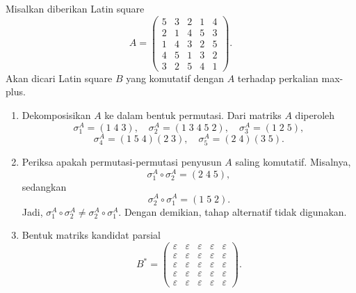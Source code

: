 \begin{contoh}\label{contoh:penerapan_algoritma_ordo_5_umum}
  Misalkan diberikan Latin square
  \[
    A=
    \begin{pmatrix}
      5 & 3 & 2 & 1 & 4 \\
      2 & 1 & 4 & 5 & 3 \\
      1 & 4 & 3 & 2 & 5 \\
      4 & 5 & 1 & 3 & 2 \\
      3 & 2 & 5 & 4 & 1
    \end{pmatrix}.
  \]
  Akan dicari Latin square $B$ yang komutatif dengan $A$ terhadap perkalian
  max-plus.

  \begin{enumerate}
    \item Dekomposisikan $A$ ke dalam bentuk permutasi. Dari matriks $A$
          diperoleh
          \[
            \sigma_1^A=(1\;4\;3),\quad
            \sigma_2^A=(1\;3\;4\;5\;2),\quad
            \sigma_3^A=(1\;2\;5),
          \]
          \[
            \sigma_4^A=(1\;5\;4)(2\;3),\quad
            \sigma_5^A=(2\;4)(3\;5).
          \]

    \item Periksa apakah permutasi-permutasi penyusun $A$ saling komutatif.
          Misalnya,
          \[
            \sigma_1^A\circ\sigma_2^A=(2\;4\;5),
          \]
          sedangkan
          \[
            \sigma_2^A\circ\sigma_1^A=(1\;5\;2).
          \]
          Jadi, $\sigma_1^A\circ\sigma_2^A\neq
            \sigma_2^A\circ\sigma_1^A$. Dengan demikian, tahap alternatif
          tidak digunakan.

    \item Bentuk matriks kandidat parsial
          \[
            B^*=
            \begin{pmatrix}
              \varepsilon & \varepsilon & \varepsilon & \varepsilon & \varepsilon \\
              \varepsilon & \varepsilon & \varepsilon & \varepsilon & \varepsilon \\
              \varepsilon & \varepsilon & \varepsilon & \varepsilon & \varepsilon \\
              \varepsilon & \varepsilon & \varepsilon & \varepsilon & \varepsilon \\
              \varepsilon & \varepsilon & \varepsilon & \varepsilon & \varepsilon
            \end{pmatrix}.
          \]


\end{enumerate}
\end{contoh}
